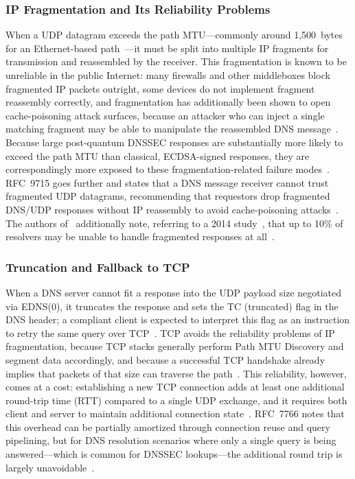 \documentclass[conference]{IEEEtran}
\begin{document}
\subsubsection{IP Fragmentation and Its Reliability Problems}

When a UDP datagram exceeds the path MTU---commonly around 1,500~bytes for an
Ethernet-based path~\cite{cloudflaremtu}---it must be split into multiple IP
fragments for transmission and reassembled by the receiver. This fragmentation
is known to be unreliable in the public Internet: many firewalls and other
middleboxes block fragmented IP packets outright, some devices do not implement
fragment reassembly correctly, and fragmentation has additionally been shown to
open cache-poisoning attack surfaces, because an attacker who can inject a
single matching fragment may be able to manipulate the reassembled DNS
message~\cite{rfc7766,fragpoison}. Because large post-quantum DNSSEC responses
are substantially more likely to exceed the path MTU than classical,
ECDSA-signed responses, they are correspondingly more exposed to these
fragmentation-related failure modes~\cite{rfc7766,dnssecrealworld}. RFC~9715
goes further and states that a DNS message receiver cannot trust fragmented UDP
datagrams, recommending that requestors drop fragmented DNS/UDP responses
without IP reassembly to avoid cache-poisoning attacks~\cite{rfc9715}. The
authors of~\cite{retrofitting} additionally note, referring to a 2014
study~\cite{dnssecrealworld}, that up to 10\% of resolvers may be unable to
handle fragmented responses at all~\cite{retrofitting,dnssecrealworld}.

\subsubsection{Truncation and Fallback to TCP}
\label{sec:tcp}

When a DNS server cannot fit a response into the UDP payload size negotiated
via EDNS(0), it truncates the response and sets the TC (truncated) flag in the
DNS header; a compliant client is expected to interpret this flag as an
instruction to retry the same query over TCP~\cite{rfc6891,rfc7766}. TCP avoids
the reliability problems of IP fragmentation, because TCP stacks generally
perform Path MTU Discovery and segment data accordingly, and because a
successful TCP handshake already implies that packets of that size can
traverse the path~\cite{rfc7766}. This reliability, however, comes at a cost:
establishing a new TCP connection adds at least one additional round-trip time
(RTT) compared to a single UDP exchange, and it requires both client and server
to maintain additional connection state~\cite{rfc7766}. RFC~7766 notes that
this overhead can be partially amortized through connection reuse and query
pipelining, but for DNS resolution scenarios where only a single query is being
answered---which is common for DNSSEC lookups---the additional round trip is
largely unavoidable~\cite{rfc7766}.
\end{document}
